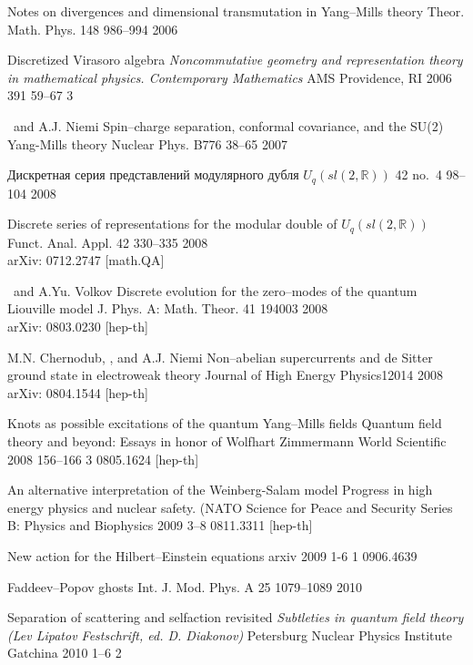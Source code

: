 {
{\LF}
{Notes on divergences and dimensional transmutation
in Yang--Mills theory}
{Theor. Math. Phys.} {148}  {986--994} {2006}

{\LF}
{Discretized Virasoro algebra}
{\em Noncommutative geometry and representation theory in
mathematical physics. Contemporary Mathematics} 
{AMS} {Providence, RI} {2006} {391} {59--67} {3} {}

{\LF\ and A.J. Niemi}
{Spin--charge separation, conformal covariance, and
the SU(2) Yang-Mills theory}
{Nuclear Phys.} {B776} {} {38--65} {2007}

{\LD}
{Дискретная серия представлений модулярного
дубля $U_q(sl(2,{\mathbb R}))$}
{\FA} {42} {no.~4} {98--104} {2008}

{\LF}
{Discrete series of representations for the modular
double of $U_q(sl(2,{\mathbb R}))$}
{Funct. Anal. Appl.} {42} {330--335} {2008}
\\ arXiv: 0712.2747 [math.QA]


{\LF\ and A.Yu. Volkov}
{ Discrete evolution for the zero--modes of the quantum Liouville model}
{J. Phys. A: Math. Theor.} {41} {} {194003} {2008}
\\ arXiv: 0803.0230 [hep-th]

{M.N. Chernodub, \LF, and A.J. Niemi}
{ Non--abelian supercurrents and de Sitter ground state in electroweak theory}
{Journal of High Energy Physics}{12}{}{014} {2008}
\\ arXiv: 0804.1544 [hep-th]


{\LF}
{Knots as possible excitations of the quantum Yang--Mills fields}  
{Quantum field theory and beyond: Essays in honor 
of Wolfhart Zimmermann} 
{World Scientific} {} {2008} {} {156--166} {3}
{0805.1624 [hep-th]}
  

{\LF}
{An alternative interpretation of the Weinberg-Salam model}
{Progress in high energy physics and nuclear safety.
(NATO Science for Peace and Security Series B: 
Physics and Biophysics} {} {} {2009} {} {3--8}
{0811.3311 [hep-th]}


{\LF}
{New action for the Hilbert--Einstein equations}
{arxiv} {} {} {2009} {} {1-6} {1}
{0906.4639}

{\LF}
{Faddeev--Popov ghosts}
{Int. J. Mod. Phys. A} {25} {} {1079--1089} {2010}

{\LF}
{Separation of scattering and selfaction revisited}
{\em Subtleties in quantum field theory (Lev Lipatov Festschrift, ed. D. Diakonov)} {Petersburg Nuclear Physics Institute} {Gatchina} {2010} {} {1--6} {2} {}

}
